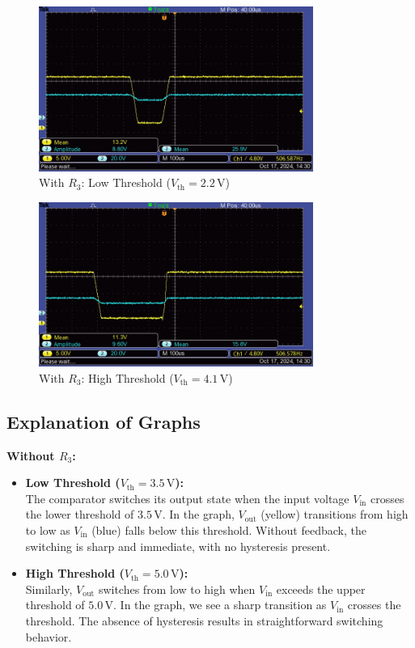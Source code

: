 \documentclass{article}
\begin{document}
\begin{figure}[H]
    \centering
    \includegraphics[width=0.8\textwidth]{img/Lab 8/R_High.JPG} %
    \caption{With \( R_3 \): Low Threshold (\( V_{\text{th}} = 2.2\,\text{V} \))}
\end{figure}

\begin{figure}[H]
    \centering
    \includegraphics[width=0.8\textwidth]{img/Lab 8/R_Low.JPG} %
    \caption{With \( R_3 \): High Threshold (\( V_{\text{th}} = 4.1\,\text{V} \))}
\end{figure}

\subsection*{Explanation of Graphs}

\textbf{Without \( R_3 \):}

\begin{itemize}
    \item \textbf{Low Threshold (\( V_{\text{th}} = 3.5\,\text{V} \)):} \\
    The comparator switches its output state when the input voltage \( V_{\text{in}} \) crosses the lower threshold of \( 3.5\,\text{V} \). In the graph, \( V_{\text{out}} \) (yellow) transitions from high to low as \( V_{\text{in}} \) (blue) falls below this threshold. Without feedback, the switching is sharp and immediate, with no hysteresis present.
    
    \item \textbf{High Threshold (\( V_{\text{th}} = 5.0\,\text{V} \)):} \\
    Similarly, \( V_{\text{out}} \) switches from low to high when \( V_{\text{in}} \) exceeds the upper threshold of \( 5.0\,\text{V} \). In the graph, we see a sharp transition as \( V_{\text{in}} \) crosses the threshold. The absence of hysteresis results in straightforward switching behavior.
\end{itemize}
\end{document}
